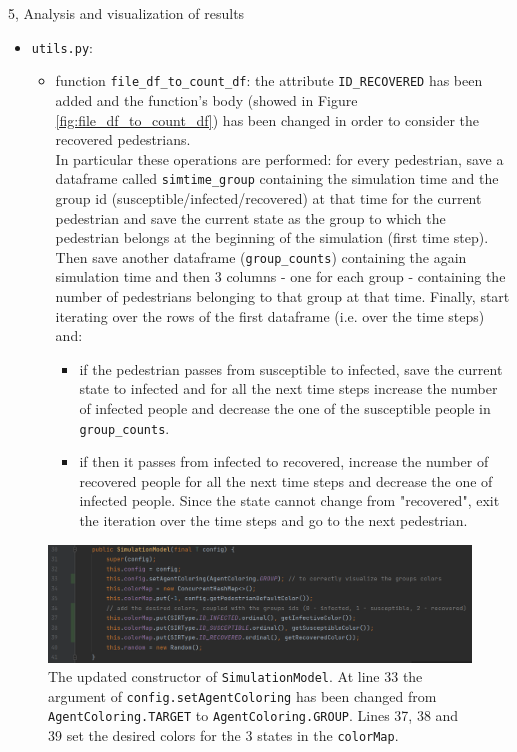 \documentclass[10pt,a4paper]{article}
\begin{document}
\begin{task}{5, Analysis and visualization of results}
\begin{itemize}
\begin{itemize}
        \item \texttt{utils.py}:
        \begin{itemize}
            \item function \texttt{file\_df\_to\_count\_df}:
            the attribute \texttt{ID\_RECOVERED} has been added and the function's body (showed in Figure \ref{fig:file_df_to_count_df}) has been changed in order to consider the recovered pedestrians.\\
            In particular these operations are performed:
            for every pedestrian, save a dataframe \cite{pandas-df} called \texttt{simtime\_group} containing the simulation time and the group id (susceptible/infected/recovered) at that time for the current pedestrian and save the current state as the group to which the pedestrian belongs at the beginning of the simulation (first time step).
            Then save another dataframe (\texttt{group\_counts}) containing the again simulation time and then 3 columns - one for each group - containing the number of pedestrians belonging to that group at that time.
            Finally, start iterating over the rows of the first dataframe (i.e. over the time steps) and:
            \begin{itemize}
                \item if the pedestrian passes from susceptible to infected, save the current state to infected and for all the next time steps increase the number of infected people and decrease the one of the susceptible people in \texttt{group\_counts}.
                
                \item if then it passes from infected to recovered, increase the number of recovered people for all the next time steps and decrease the one of infected people.
                Since the state cannot change from "recovered", exit the iteration over the time steps and go to the next pedestrian.
            \end{itemize}
        \end{itemize}
    \end{itemize}
\end{itemize}

\begin{figure}[H]
    \centering
    \includegraphics[scale=0.7]{images/SimulationModel-constructor.png}
    \caption{The updated constructor of \texttt{SimulationModel}.
    At line 33 the argument of \texttt{config.setAgentColoring} has been changed from \texttt{AgentColoring.TARGET} to \texttt{AgentColoring.GROUP}.
    Lines 37, 38 and 39 set the desired colors for the 3 states in the \texttt{colorMap}.}
    \label{fig:simmodel-constructor}
\end{figure}


\end{task}
\end{document}
